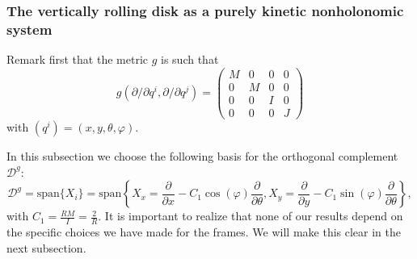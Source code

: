 \documentclass[11pt]{article}
\def\I{I}
\def\J{J}
\def\m{M}
\def\Ra{R}
\def\ce{C_1}
\begin{document}
\subsubsection{The vertically rolling disk as a purely kinetic nonholonomic system} \label{sec81}


Remark first that the metric $g$ is such that 
$$
g({\partial}/{\partial q^i},{\partial}{/\partial q^j})= \begin{pmatrix} \m & 0& 0& 0\\0 & \m &0& 0 \\ 0&0&\I&0 \\0&0&0&\J  \end{pmatrix}
$$
with $(q^i)=(x,y,\theta,\varphi)$. 

 In this subsection we choose the following basis for the orthogonal complement $\mathcal{D}^g$:
$$
\mathcal{D}^g=\text{span}\{X_i\}=\text{span}\left\{X_x=\frac{\partial}{\partial x}-\ce\cos(\varphi)\frac{\partial}{\partial \theta},X_y=\frac{\partial}{\partial y}-\ce\sin(\varphi)\frac{\partial}{\partial \theta}\right\},
$$
with $\ce = \frac{\Ra\m}{\I} = \frac{2}{R}$. It is important to realize that none of our results depend on the specific choices we have made for the frames. We will make this clear in the next subsection.
\end{document}
